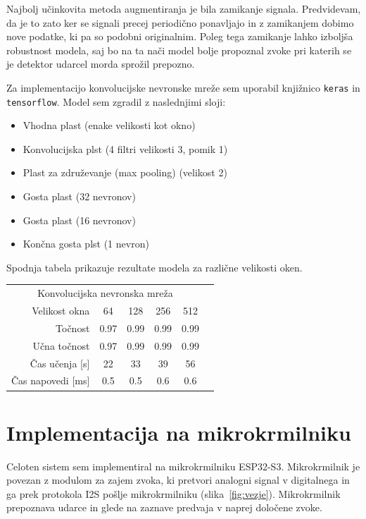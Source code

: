 \documentclass[11pt,a4paper]{article}
\begin{document}
Najbolj učinkovita metoda augmentiranja je bila zamikanje signala. Predvidevam, da je to zato ker se signali precej periodično ponavljajo in z zamikanjem dobimo nove podatke, ki pa so podobni originalnim. Poleg tega zamikanje lahko izboljša robustnost modela, saj bo na ta nači model bolje propoznal zvoke pri katerih se je detektor udarcel morda sprožil prepozno.

Za implementacijo konvolucijske nevronske mreže sem uporabil knjižnico \texttt{keras} in \texttt{tensorflow}. Model sem zgradil z naslednjimi sloji:
\begin{itemize}
    \item Vhodna plast (enake velikosti kot okno)
    \item Konvolucijska plst (4 filtri velikosti 3, pomik 1)
    \item Plast za združevanje (max pooling) (velikost 2)
    \item Gosta plast (32 nevronov)
    \item Gosta plast (16 nevronov)
    \item Končna gosta plst (1 nevron)
\end{itemize}

Spodnja tabela prikazuje rezultate modela za različne velikosti oken.

\begin{center}

    \begin{tabular}{r | c c c c c}
        \multicolumn{5}{c}{Konvolucijska nevronska mreža}\\
        \tiny{Velikost okna} & \small{64} & \small{128} & \small{256} & \small{512}\\ \hline
        \tiny{Točnost} & \small{0.97} & \small{0.99} & \small{0.99} & \small{0.99}\\
        \tiny{Učna točnost} & \small{0.97} & \small{0.99} & \small{0.99} & \small{0.99}\\
        \tiny{Čas učenja [s]} & \small{22} & \small{33} & \small{39} & \small{56}\\
        \tiny{Čas napovedi [ms]} & \small{0.5} & \small{0.5} & \small{0.6} & \small{0.6}\\
        \end{tabular}

\end{center}

\section{Implementacija na mikrokrmilniku}
Celoten sistem sem implementiral na mikrokrmilniku ESP32-S3. Mikrokrmilnik je povezan z modulom za zajem zvoka, ki pretvori analogni signal v digitalnega in ga prek protokola I2S pošlje mikrokrmilniku (slika~\ref{fig:vezje}). Mikrokrmilnik prepoznava udarce in glede na zaznave predvaja v naprej določene zvoke.
\end{document}
